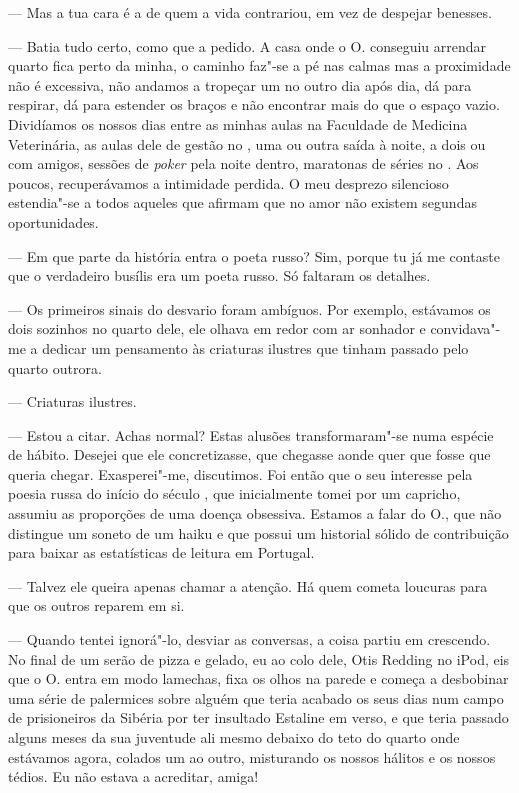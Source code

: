 --- Mas a tua cara é a de quem a vida contrariou, em vez de despejar
  benesses.

--- Batia tudo certo, como que a pedido. A casa onde o
O. conseguiu arrendar quarto fica perto da minha, o caminho faz"-se a
pé nas calmas mas a proximidade não é excessiva, não andamos a tropeçar
um no outro dia após dia, dá para respirar, dá para estender os braços e
não encontrar mais do que o espaço vazio. Dividíamos os nossos dias
entre as minhas aulas na Faculdade de Medicina Veterinária, as aulas
dele de gestão no , uma ou outra saída à noite, a dois ou com
amigos, sessões de \emph{poker }pela noite dentro, maratonas de séries
no . Aos poucos, recuperávamos a intimidade perdida. O meu desprezo
silencioso estendia"-se a todos aqueles que afirmam que no amor não
existem segundas oportunidades.

--- Em que parte da história entra o poeta russo? Sim, porque tu já me
  contaste que o verdadeiro busílis era um poeta russo. Só faltaram os
  detalhes.

--- Os primeiros sinais do desvario foram ambíguos. Por exemplo, estávamos
  os dois sozinhos no quarto dele, ele olhava em redor com ar sonhador e
  convidava"-me a dedicar um pensamento às criaturas ilustres que
  tinham passado pelo quarto outrora.

--- Criaturas ilustres.

--- Estou a citar. Achas normal? Estas alusões transformaram"-se numa
  espécie de hábito. Desejei que ele concretizasse, que chegasse aonde
  quer que fosse que queria chegar. Exasperei"-me, discutimos. Foi
  então que o seu interesse pela poesia russa do início do século ,
  que inicialmente tomei por um capricho, assumiu as proporções de uma
  doença obsessiva. Estamos a falar do O., que não distingue um soneto
  de um haiku e que possui um historial sólido de contribuição para
baixar as estatísticas de leitura em Portugal.

--- Talvez ele queira apenas chamar a atenção. Há quem cometa loucuras
  para que os outros reparem em si.

--- Quando tentei ignorá"-lo, desviar as conversas, a coisa partiu em
  crescendo. No final de um serão de pizza e gelado, eu ao colo dele,
  Otis Redding no iPod, eis que o O. entra em modo lamechas, fixa os
  olhos na parede e começa a desbobinar uma série de palermices sobre
  alguém que teria acabado os seus dias num campo de prisioneiros da
  Sibéria por ter insultado Estaline em verso, e que teria passado
  alguns meses da sua juventude ali mesmo debaixo do teto do quarto
  onde estávamos agora, colados um ao outro, misturando os nossos
  hálitos e os nossos tédios. Eu não estava a acreditar, amiga!

